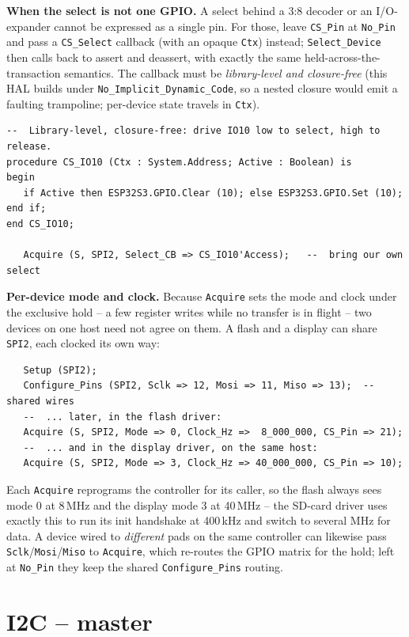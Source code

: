 \textbf{When the select is not one GPIO.} A select behind a 3:8 decoder or an
I/O-expander cannot be expressed as a single pin. For those, leave
\texttt{CS\_Pin} at \texttt{No\_Pin} and pass a \texttt{CS\_Select} callback (with
an opaque \texttt{Ctx}) instead; \texttt{Select\_Device} then calls back to assert
and deassert, with exactly the same held-across-the-transaction semantics. The
callback must be \emph{library-level and closure-free} (this HAL builds under
\texttt{No\_Implicit\_Dynamic\_Code}, so a nested closure would emit a faulting
trampoline; per-device state travels in \texttt{Ctx}).

\begin{lstlisting}
--  Library-level, closure-free: drive IO10 low to select, high to release.
procedure CS_IO10 (Ctx : System.Address; Active : Boolean) is
begin
   if Active then ESP32S3.GPIO.Clear (10); else ESP32S3.GPIO.Set (10); end if;
end CS_IO10;

   Acquire (S, SPI2, Select_CB => CS_IO10'Access);   --  bring our own select
\end{lstlisting}

\textbf{Per-device mode and clock.} Because
\texttt{Acquire} sets the mode and clock under the exclusive hold -- a few register
writes while no transfer is in flight -- two devices on one host need not agree on
them. A flash and a display can share \texttt{SPI2}, each clocked its own way:

\begin{lstlisting}
   Setup (SPI2);
   Configure_Pins (SPI2, Sclk => 12, Mosi => 11, Miso => 13);  --  shared wires
   --  ... later, in the flash driver:
   Acquire (S, SPI2, Mode => 0, Clock_Hz =>  8_000_000, CS_Pin => 21);
   --  ... and in the display driver, on the same host:
   Acquire (S, SPI2, Mode => 3, Clock_Hz => 40_000_000, CS_Pin => 10);
\end{lstlisting}

\noindent Each \texttt{Acquire} reprograms the controller for its caller, so the
flash always sees mode 0 at 8\,MHz and the display mode 3 at 40\,MHz -- the SD-card
driver uses exactly this to run its init handshake at 400\,kHz and switch to several
MHz for data. A device wired to \emph{different} pads on the same controller can
likewise pass \texttt{Sclk}/\texttt{Mosi}/\texttt{Miso} to \texttt{Acquire}, which
re-routes the GPIO matrix for the hold; left at \texttt{No\_Pin} they keep the shared
\texttt{Configure\_Pins} routing.

\section{I2C -- master}

